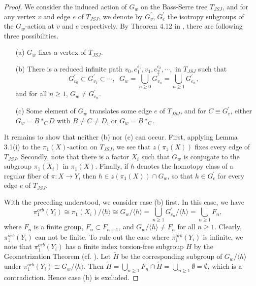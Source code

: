 \documentclass[11pt]{amsart}
\theoremstyle{plain}
\numberwithin{theorem}{section}
\theoremstyle{definition}
\begin{document}
\begin{proof}
We consider the induced action of $G_w$ on the Bass-Serre tree $T_{JSJ}$, and for any vertex $v$ 
and edge $e$ of $T_{JSJ}$, we denote by $G_v^\prime$, $G_e^\prime$ the isotropy subgroups of
the $G_w$-action at $v$ and $e$ respectively. By Theorem 4.12 in \cite{DD}, there are following
three possibilities.

\begin{itemize}
\item [{(a)}] $G_w$ fixes a vertex of $T_{JSJ}$.
\item [{(b)}] There is a reduced infinite path $v_0,e_1^{\epsilon_1},v_1, e_2^{\epsilon_2}, \cdots,$ in
$T_{JSJ}$ such that 
$$
G_{v_0}^\prime\subset G_{v_1}^\prime\subset \cdots,\;\; 
G_w=\bigcup_{n\geq 0} G_{v_n}^\prime=\bigcup_{n\geq 1}G_{e_n}^\prime,
$$
and for all $n\geq 1$, $G_w\neq G_{e_n}^\prime$.
\item [{(c)}] Some element of $G_w$ translates some edge $e$ of $T_{JSJ}$, and for $C\equiv G_e^\prime$,
either $G_w=B\ast_C D$ with $B\neq C\neq D$, or $G_w=B\ast_C$.
\end{itemize}

It remains to show that neither (b) nor (c) can occur. First, applying Lemma 3.1(i) to the 
$\pi_1(X)$-action on $T_{JSJ}$, we see that $z(\pi_1(X))$ fixes every edge of $T_{JSJ}$. 
Secondly, note that there is a factor $X_i$ such that $G_w$ is conjugate to the subgroup
$\pi_1(X_i)$ in $\pi_1(X)$. Finally, if $h$ denotes the homotopy class of a regular fiber of 
$\pi:X\rightarrow Y$, then $h\in z(\pi_1(X))\cap G_w$, so that $h\in G^\prime_e$ for every 
edge $e$ of $T_{JSJ}$. 

With the preceding understood, we consider case (b) first. In this case, we have 
$$
\pi_1^{orb}(Y_i)\cong\pi_1(X_i)/\langle h\rangle\cong G_w/\langle h\rangle 
= \bigcup_{n\geq 1}G_{e_n}^\prime/\langle h\rangle=\bigcup_{n\geq 1} F_n,
$$
where $F_n$ is a finite group, $F_n\subset F_{n+1}$, and $G_w/\langle h\rangle \neq F_n$ for all 
$n\geq 1$. Clearly, $\pi_1^{orb}(Y_i)$ can not be finite. To rule out the case where $\pi_1^{orb}(Y_i)$ 
is infinite, we note that $\pi_1^{orb}(Y_i)$ has a finite index torsion-free subgroup $H$ by the 
Geometrization Theorem (cf. \cite{BLP, MM}). Let $\tilde{H}$ be the corresponding subgroup of 
$G_w/\langle h\rangle$ under $\pi_1^{orb}(Y_i)\cong G_w/\langle h\rangle$. Then 
$\tilde{H}=\bigcup_{n\geq 1} F_n\cap \tilde{H}=\bigcup_{n\geq 1} \emptyset=\emptyset$, which is a contradiction. Hence case (b) is excluded.


\end{proof}
\end{document}
